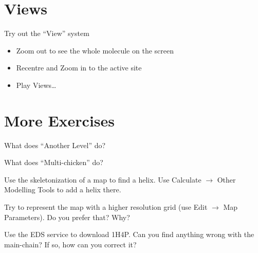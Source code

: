 \documentclass{article}
\begin{document}
\section{Views}

Try out the ``View'' system
\begin{itemize}
\item Zoom out to see the whole molecule on the screen
\item Recentre and Zoom in to the active site
\item Play Views\ldots
\end{itemize}


\section{More Exercises}
\begin{trivlist}
\item What does ``Another Level'' do? 
\item What does ``Multi-chicken'' do?
\item Use the skeletonization of a map to find a helix.  Use
  \textsf{Calculate $\rightarrow$ Other Modelling Tools} to add a
  helix there.
\item Try to represent the map with a higher resolution grid (use
  \textsf{Edit $\rightarrow$ Map Parameters}).  Do you prefer that?
  Why?
\item Use the EDS service to download 1H4P.  Can you find anything
  wrong with the main-chain?  If so, how can you correct it?
\end{trivlist}
\end{document}
